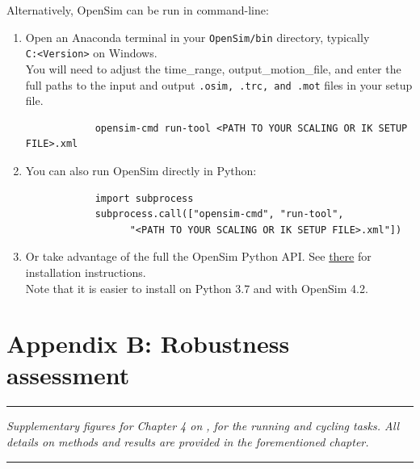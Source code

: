 Alternatively, OpenSim can be run in command-line:
\begin{enumerate}[itemsep=0em, topsep=0em, leftmargin=*]
      \item Open an Anaconda terminal in your \texttt{OpenSim/bin} directory, typically \\\texttt{C:\OpenSim <Version>\bin} on Windows.\\
      You will need to adjust the time\_range, output\_motion\_file, and enter the full paths to the input and output \texttt{.osim, .trc, and .mot} files in your setup file.
      \begin{verbatim}        
            opensim-cmd run-tool <PATH TO YOUR SCALING OR IK SETUP FILE>.xml
      \end{verbatim}

      \item You can also run OpenSim directly in Python:
      \begin{verbatim}
            import subprocess
            subprocess.call(["opensim-cmd", "run-tool", 
                  "<PATH TO YOUR SCALING OR IK SETUP FILE>.xml"])
      \end{verbatim}
      
      \item Or take advantage of the full the OpenSim Python API. See \href{https://simtk-confluence.stanford.edu:8443/display/OpenSim/Scripting+in+Python}{there} for installation instructions.\\
      Note that it is easier to install on Python 3.7 and with OpenSim 4.2.

\end{enumerate}




\chapter{Appendix B: Robustness assessment}
\label{Ann:1}


\begin{center}
\rule{0.7\linewidth}{.5pt}
\begin{minipage}{0.7\linewidth}
\smallskip

\textit{
Supplementary figures for Chapter 4 on , for the running and cycling tasks. \newline\newline All details on methods and results are provided in the forementioned chapter.
}

\end{minipage}
\smallskip
\rule{0.7\linewidth}{.5pt}
\end{center}

